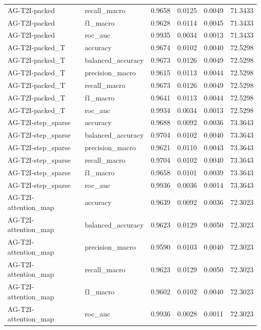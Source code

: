 \begin{tabular}{llrrrr}
AG-T2I-packed & recall_macro & 0.9658 & 0.0125 & 0.0049 & 71.3433 \\
AG-T2I-packed & f1_macro & 0.9628 & 0.0114 & 0.0045 & 71.3433 \\
AG-T2I-packed & roc_auc & 0.9935 & 0.0034 & 0.0013 & 71.3433 \\
AG-T2I-packed_T & accuracy & 0.9674 & 0.0102 & 0.0040 & 72.5298 \\
AG-T2I-packed_T & balanced_accuracy & 0.9673 & 0.0126 & 0.0049 & 72.5298 \\
AG-T2I-packed_T & precision_macro & 0.9615 & 0.0113 & 0.0044 & 72.5298 \\
AG-T2I-packed_T & recall_macro & 0.9673 & 0.0126 & 0.0049 & 72.5298 \\
AG-T2I-packed_T & f1_macro & 0.9641 & 0.0113 & 0.0044 & 72.5298 \\
AG-T2I-packed_T & roc_auc & 0.9934 & 0.0034 & 0.0013 & 72.5298 \\
AG-T2I-step_sparse & accuracy & 0.9688 & 0.0092 & 0.0036 & 73.3643 \\
AG-T2I-step_sparse & balanced_accuracy & 0.9704 & 0.0102 & 0.0040 & 73.3643 \\
AG-T2I-step_sparse & precision_macro & 0.9621 & 0.0110 & 0.0043 & 73.3643 \\
AG-T2I-step_sparse & recall_macro & 0.9704 & 0.0102 & 0.0040 & 73.3643 \\
AG-T2I-step_sparse & f1_macro & 0.9658 & 0.0101 & 0.0039 & 73.3643 \\
AG-T2I-step_sparse & roc_auc & 0.9936 & 0.0036 & 0.0014 & 73.3643 \\
AG-T2I-attention_map & accuracy & 0.9639 & 0.0092 & 0.0036 & 72.3023 \\
AG-T2I-attention_map & balanced_accuracy & 0.9623 & 0.0129 & 0.0050 & 72.3023 \\
AG-T2I-attention_map & precision_macro & 0.9590 & 0.0103 & 0.0040 & 72.3023 \\
AG-T2I-attention_map & recall_macro & 0.9623 & 0.0129 & 0.0050 & 72.3023 \\
AG-T2I-attention_map & f1_macro & 0.9602 & 0.0102 & 0.0040 & 72.3023 \\
AG-T2I-attention_map & roc_auc & 0.9936 & 0.0028 & 0.0011 & 72.3023 \\
\bottomrule
\end{tabular}
